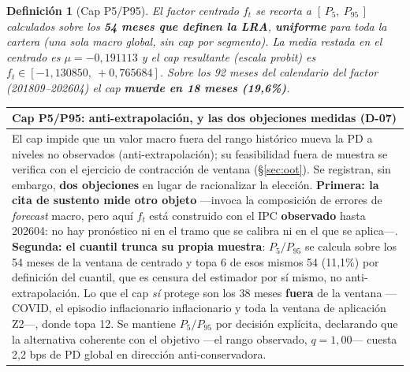 \documentclass[12pt, a4paper]{article}
\newcommand{\PD}{\ensuremath{\mathrm{PD}}}
\newcommand{\ft}{\ensuremath{f_t}}
\newtheorem{definicion}{Definición}[section]
\newenvironment{recuadro}[1]
{\begin{center}\begin{tabular}{|p{0.92\textwidth}|}
\hline
\rowcolor{grissuave}
\textbf{#1} \\ \hline
}
{\\ \hline \end{tabular}\end{center}}
\begin{document}
\begin{definicion}[Cap P5/P95]
El factor centrado $\ft$ se recorta a $[\,P_{5},\ P_{95}\,]$ calculados sobre los
\textbf{54 meses que definen la LRA}, \textbf{uniforme} para toda la cartera (una sola macro
global, sin cap por segmento). La media restada en el centrado es $\mu=-0{,}191113$ y el cap
resultante (escala probit) es $\ft\in[-1{,}130850,\ +0{,}765684]$. Sobre los 92 meses del
calendario del factor (201809--202604) el cap \textbf{muerde en 18 meses (19,6\%)}.
\end{definicion}

\begin{recuadro}{Cap P5/P95: anti-extrapolación, y las dos objeciones medidas (D-07)}
El cap impide que un valor macro fuera del rango histórico mueva la \PD{} a niveles no observados
(anti-extrapolación); su feasibilidad fuera de muestra se verifica con el ejercicio de contracción
de ventana (\S\ref{sec:oot}). Se registran, sin embargo, \textbf{dos objeciones} en lugar de
racionalizar la elección. \textbf{Primera: la cita de sustento mide otro objeto} ---invoca la
composición de errores de \emph{forecast} macro, pero aquí $\ft$ está construido con el IPC
\textbf{observado} hasta 202604: no hay pronóstico ni en el tramo que se calibra ni en el que se
aplica---. \textbf{Segunda: el cuantil trunca su propia muestra}: $P_5/P_{95}$ se calcula sobre los
54 meses de la ventana de centrado y topa 6 de esos mismos 54 (11,1\%) por definición del cuantil,
que es censura del estimador por sí mismo, no anti-extrapolación. Lo que el cap \emph{sí} protege
son los 38 meses \textbf{fuera} de la ventana ---COVID, el episodio inflacionario inflacionario y toda la ventana de
aplicación Z2---, donde topa 12. Se mantiene $P_5/P_{95}$ por decisión explícita, declarando que la
alternativa coherente con el objetivo ---el rango observado, $q=1{,}00$--- cuesta 2,2 bps de \PD{}
global en dirección anti-conservadora.
\end{recuadro}
\end{document}
